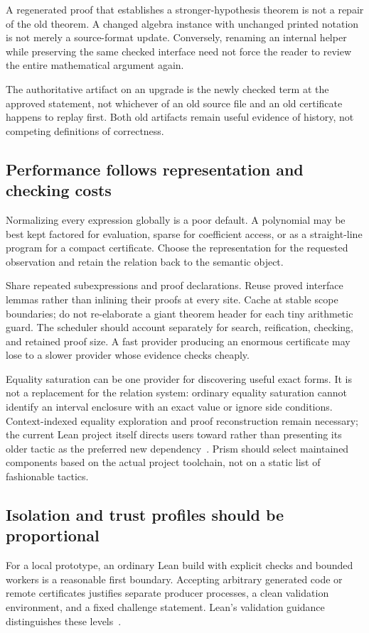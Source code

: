 \documentclass[11pt,a4paper]{article}
\newcommand{\code}[1]{\texttt{\detokenize{#1}}}
\theoremstyle{definition}
\theoremstyle{remark}
\begin{document}
A regenerated proof that establishes a stronger-hypothesis theorem is not a repair of the old theorem. A changed algebra instance with unchanged printed notation is not merely a source-format update. Conversely, renaming an internal helper while preserving the same checked interface need not force the reader to review the entire mathematical argument again.

The authoritative artifact on an upgrade is the newly checked term at the approved statement, not whichever of an old source file and an old certificate happens to replay first. Both old artifacts remain useful evidence of history, not competing definitions of correctness.

\subsection{Performance follows representation and checking costs}
Normalizing every expression globally is a poor default. A polynomial may be best kept factored for evaluation, sparse for coefficient access, or as a straight-line program for a compact certificate. Choose the representation for the requested observation and retain the relation back to the semantic object.

Share repeated subexpressions and proof declarations. Reuse proved interface lemmas rather than inlining their proofs at every site. Cache at stable scope boundaries; do not re-elaborate a giant theorem header for each tiny arithmetic guard. The scheduler should account separately for search, reification, checking, and retained proof size. A fast provider producing an enormous certificate may lose to a slower provider whose evidence checks cheaply.

Equality saturation can be one provider for discovering useful exact forms. It is not a replacement for the relation system: ordinary equality saturation cannot identify an interval enclosure with an exact value or ignore side conditions. Context-indexed equality exploration and proof reconstruction remain necessary; the current Lean \code{egg} project itself directs users toward \code{grind} rather than presenting its older tactic as the preferred new dependency~\cite{egg}. Prism should select maintained components based on the actual project toolchain, not on a static list of fashionable tactics.

\subsection{Isolation and trust profiles should be proportional}
For a local prototype, an ordinary Lean build with explicit checks and bounded workers is a reasonable first boundary. Accepting arbitrary generated code or remote certificates justifies separate producer processes, a clean validation environment, and a fixed challenge statement. Lean's validation guidance distinguishes these levels~\cite{leanvalidation}.
\end{document}
